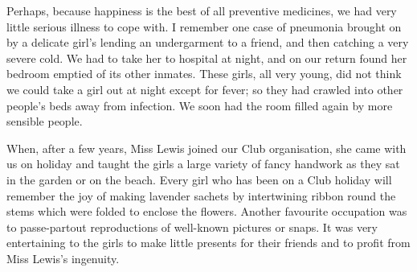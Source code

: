 Perhaps, because happiness is the best of all preventive
medicines, we had very little serious illness to cope
with. I remember one case of pneumonia brought on by
a delicate girl’s lending an undergarment to a friend, and
then catching a very severe cold. We had to take her to
hospital at night, and on our return found her bedroom
emptied of its other inmates. These girls, all very young,
did not think we could take a girl out at night except
for fever; so they had crawled into other people’s beds
away from infection. We soon had the room filled again
by more sensible people.

When, after a few years, Miss Lewis joined our Club
organisation, she came with us on holiday and taught the
girls a large variety of fancy handwork as they sat in
the garden or on the beach. Every girl who has been on
a Club holiday will remember the joy of making lavender
sachets by intertwining ribbon round the stems which
were folded to enclose the flowers. Another favourite
occupation was to passe-partout reproductions of well-known
pictures or snaps. It was very entertaining to the
girls to make little presents for their friends and to profit
from Miss Lewis’s ingenuity.

